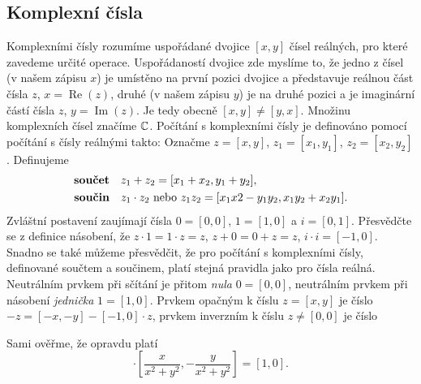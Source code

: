     \subsection{Komplexní čísla}
      Komplexními čísly rozumíme uspořádané dvojice \([x, y]\) čísel reálných, pro které zavedeme 
      určité operace. Uspořádaností dvojice zde myslíme to, že jedno z čísel (v našem zápisu \(x\)) 
      je umístěno na první pozici dvojice a představuje reálnou část čísla \(z\), \(x = 
      \operatorname{Re}(z)\), druhé (v našem zápisu \(y\)) je na druhé pozici a je imaginární částí 
      čísla \(z\), \(y = \operatorname{Im}(z)\). Je tedy obecně  \( [x, y] ≠ [y, x]\). Množinu
      komplexních čísel značíme \(\mathbb{C}\). Počítání s komplexními čísly je definováno pomocí 
      počítání s čísly reálnými takto: Označme \(z = [x, y]\), \(z_1 = [x_1, y_1]\), \(z_2 = 
      [x_2, y_2]\). Definujeme
      \begin{align}\label{mai:eq72}
        \text{\textbf{součet}}\quad & z_1 + z_2 = [x_1 + x_2, y_1 + y_2],    \nonumber \\
        \text{\textbf{součin}}\quad & z_1 \cdot z_2 \text{ nebo } z_1z_2 = [x_1x2-y_1y_2, 
        x_1y_2+x_2y_1]. 
      \end{align}
      Zvláštní postavení zaujímají čísla \(0 = [0, 0]\), \(1 = [1, 0]\) a \(i = [0, 1]\). 
      Přesvědčte se z definice násobení, že \(z \cdot 1 = 1 \cdot z = z\), \(z + 0 = 0 + z = z\), 
      \(i \cdot i = [-1, 0]\). Snadno se také můžeme přesvědčit, že pro počítání s komplexními 
      čísly, definované součtem a součinem, platí stejná pravidla jako pro čísla reálná. Neutrálním 
      prvkem při sčítání je přitom \emph{nula} \(0 = [0, 0]\), neutrálním prvkem při násobení 
      \emph{jednička} \(1 = [1, 0]\). Prvkem opačným k číslu \(z = [x, y]\) je číslo \(-z = [-x, 
      -y] - [-1, 0] \cdot z\), prvkem inverzním k číslu \(z\neq [0, 0]\) je číslo
      
      Sami ověřme, že opravdu platí
      \begin{equation*}
        [x,y]\cdot\left[\dfrac{x}{x^2 + y^2}, -\dfrac{y}{x^2 + y^2} \right] = [1,0].
      \end{equation*}
      
